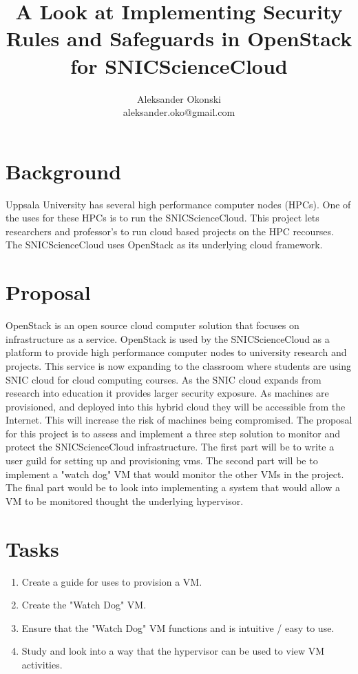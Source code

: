 \documentclass[12pt]{article}
\title{A Look at Implementing Security Rules and Safeguards in OpenStack for SNICScienceCloud}
\author{Aleksander Okonski \\ aleksander.oko@gmail.com}
\date{}
\begin{document}
\maketitle

\section{Background}
Uppsala University has several high performance computer nodes (HPCs). One of the uses for these HPCs is to run the SNICScienceCloud. This project lets researchers and professor's to run cloud based projects on the HPC recourses. The SNICScienceCloud uses OpenStack as its underlying cloud framework.


\section{Proposal}
OpenStack is an open source cloud computer solution that focuses on infrastructure as a service. OpenStack is used by the SNICScienceCloud as a platform to provide high performance computer nodes to university research and projects. This service is now expanding to the classroom where students are using SNIC cloud for cloud computing courses. As the SNIC cloud expands from research into education it provides larger security exposure. As machines are provisioned, and deployed into this hybrid cloud they will be accessible from the Internet. This will increase the risk of machines being compromised. The proposal for this project is to assess and implement a three step solution to monitor and protect the SNICScienceCloud infrastructure. The first part will be to write a user guild for setting up and provisioning vms. The second part will be to implement a "watch dog" VM that would monitor the other VMs in the project. The final part would be to look into implementing a system that would allow a VM to be monitored thought the underlying hypervisor.

\section{Tasks}

\begin{enumerate}
    \item Create a guide for uses to provision a VM.
    \item Create the "Watch Dog" VM.
    \item Ensure that the "Watch Dog" VM functions and is intuitive / easy to use.
    \item Study and look into a way that the hypervisor can be used to view VM activities.
\end{enumerate}
\end{document}
